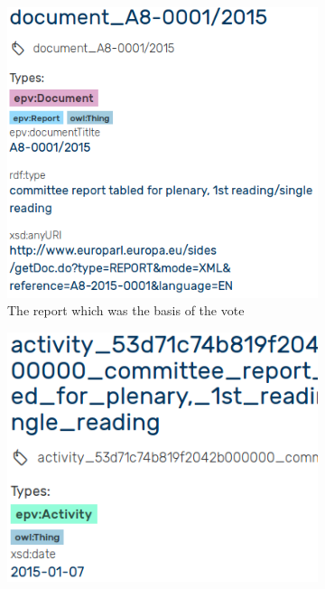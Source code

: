 \documentclass{article}
\begin{document}
\begin{figure}
\begin{subfigure}{.33\textwidth}
  \centering
  \includegraphics[width=\linewidth]{images/document.png}
  \caption{The report which was the basis of the vote}
  \label{fig:propertiesDocument}
\end{subfigure}%
\begin{subfigure}{.33\textwidth}
  \centering
  \includegraphics[width=\linewidth]{images/activity.png}

\end{subfigure}
\end{figure}
\end{document}
